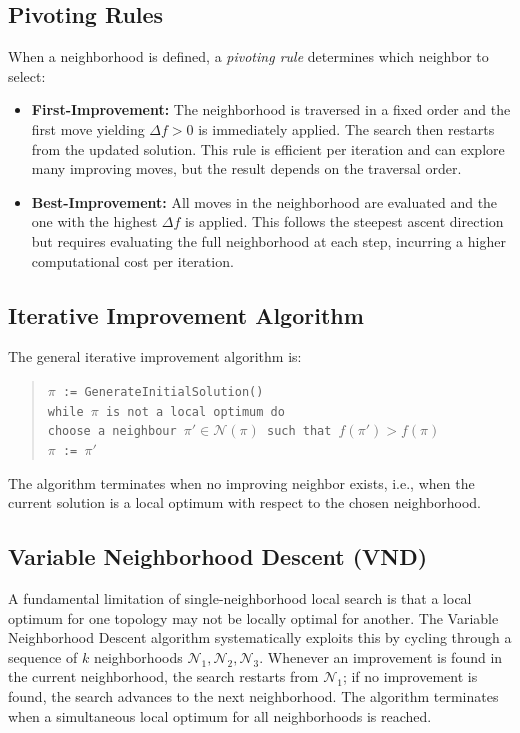 \documentclass[11pt, a4paper]{article}
\begin{document}
\subsection{Pivoting Rules}

When a neighborhood is defined, a \emph{pivoting rule} determines which neighbor to select:

\begin{itemize}
    \item \textbf{First-Improvement:} The neighborhood is traversed in a fixed order and the first move yielding $\Delta f > 0$ is immediately applied. The search then restarts from the updated solution. This rule is efficient per iteration and can explore many improving moves, but the result depends on the traversal order.
    \item \textbf{Best-Improvement:} All moves in the neighborhood are evaluated and the one with the highest $\Delta f$ is applied. This follows the steepest ascent direction but requires evaluating the full neighborhood at each step, incurring a higher computational cost per iteration.
\end{itemize}

\subsection{Iterative Improvement Algorithm}

The general iterative improvement algorithm is:

\begin{quote}
\texttt{$\pi$ := GenerateInitialSolution()}\\
\texttt{while $\pi$ is not a local optimum do}\\
\quad \texttt{choose a neighbour $\pi' \in \mathcal{N}(\pi)$ such that $f(\pi') > f(\pi)$}\\
\quad \texttt{$\pi$ := $\pi'$}
\end{quote}

The algorithm terminates when no improving neighbor exists, i.e., when the current solution is a local optimum with respect to the chosen neighborhood.

\subsection{Variable Neighborhood Descent (VND)}

A fundamental limitation of single-neighborhood local search is that a local optimum for one topology may not be locally optimal for another. The Variable Neighborhood Descent algorithm systematically exploits this by cycling through a sequence of $k$ neighborhoods $\mathcal{N}_1, \mathcal{N}_2, \mathcal{N}_3$. Whenever an improvement is found in the current neighborhood, the search restarts from $\mathcal{N}_1$; if no improvement is found, the search advances to the next neighborhood. The algorithm terminates when a simultaneous local optimum for all neighborhoods is reached.
\end{document}

